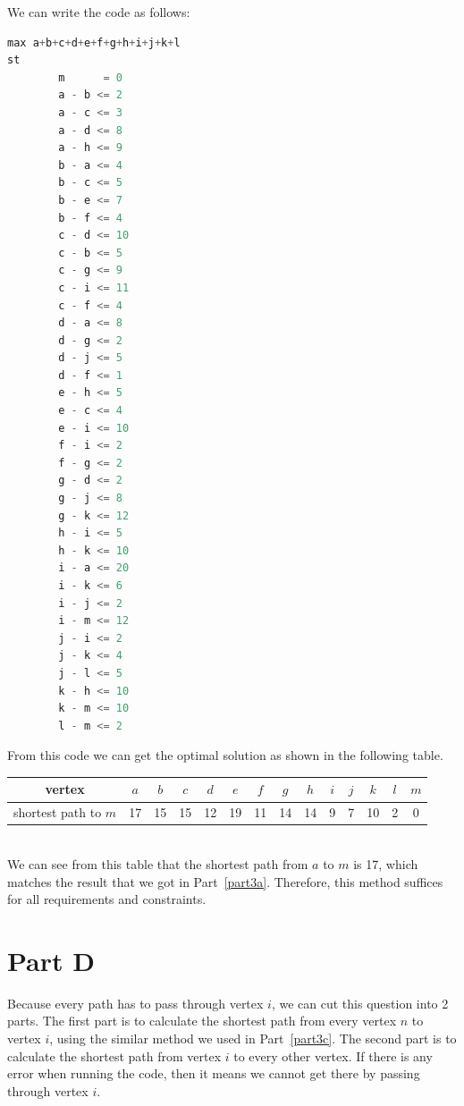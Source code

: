 \documentclass[11pt]{scrreprt}
\begin{document}
We can write the code as follows:
\begin{lstlisting}[language=c]
max a+b+c+d+e+f+g+h+i+j+k+l
st
        m      = 0 
        a - b <= 2
        a - c <= 3
        a - d <= 8
        a - h <= 9
        b - a <= 4
        b - c <= 5
        b - e <= 7
        b - f <= 4
        c - d <= 10
        c - b <= 5
        c - g <= 9
        c - i <= 11
        c - f <= 4
        d - a <= 8
        d - g <= 2
        d - j <= 5
        d - f <= 1
        e - h <= 5
        e - c <= 4
        e - i <= 10
        f - i <= 2
        f - g <= 2
        g - d <= 2
        g - j <= 8
        g - k <= 12
        h - i <= 5
        h - k <= 10
        i - a <= 20
        i - k <= 6
        i - j <= 2
        i - m <= 12
        j - i <= 2
        j - k <= 4
        j - l <= 5
        k - h <= 10
        k - m <= 10
        l - m <= 2
\end{lstlisting}

From this code we can get the optimal solution as shown in the following table.\\
\begin{tabular}{|c|c|c|c|c|c|c|c|c|c|c|c|c|c|}
	\hline vertex & $a$   &  $b$ & $c$ & $d$ & $e$ & $f$ & $g$ & $h$ & $i$  & $j$ & $k$ & $l$ & $m$   \\
	\hline shortest path to $m$ & 17 & 15 & 15 & 12 & 19 & 11 & 14 & 14 & 9 & 7 & 10 & 2 & 0 \\
	\hline
\end{tabular} \\

We can see from this table that the shortest path from $a$ to $m$ is 17, which matches the result that we got in Part~\ref{part3a}. Therefore, this method suffices for all requirements and constraints.

\section{Part D}

Because every path has to pass through vertex $i$, we can cut this question into 2 parts. The first part is to calculate the shortest path from every vertex $n$ to vertex $i$, using the similar method we used in Part~\ref{part3c}. The second part is to calculate the shortest path from vertex $i$ to every other vertex. If there is any error when running the code, then it means we cannot get there by passing through vertex $i$.\\
\end{document}
